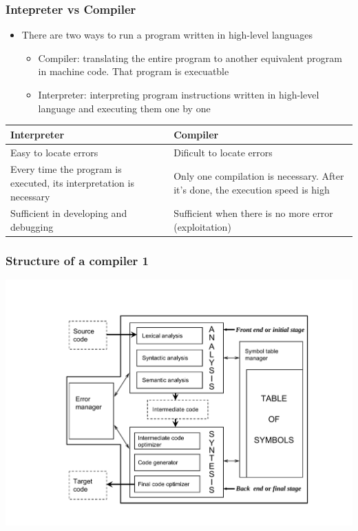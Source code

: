 \documentclass{beamer}
\begin{document}
\begin{frame}
\frametitle{Intepreter vs Compiler}
\begin{itemize}
\item There are two ways to run a program written in high-level languages
\begin{itemize}
\item Compiler: translating the entire program to another equivalent program in machine code. That program is execuatble
\item Interpreter: interpreting program instructions written in high-level language and executing them one by one
\end{itemize}
\end{itemize}

\begin{table}
\begin{tabular}{|p{5cm}|p{5cm}|}
\hline
Interpreter & Compiler \\
\hline
Easy to locate errors&Dificult to locate errors\\
\hline
Every time the program is executed, its interpretation is necessary& Only one compilation is necessary. After it's done, the execution speed is high\\
\hline
Sufficient in developing and debugging& Sufficient when there is no more error (exploitation)\\
\hline
\end{tabular}
\end{table}
\end{frame}


\begin{frame}
\frametitle{Structure of a compiler 1}
\begin{center}
\includegraphics[scale=0.5]{3}
\end{center}
\end{frame}
\end{document}
